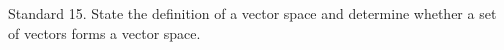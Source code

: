 Standard 15.	State the definition of a vector space and determine whether a set of vectors forms a vector space.



\ifprintanswers
\else %
 \newpage
\fi

\begin{solution}
   
\end{solution}
